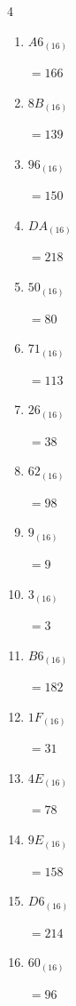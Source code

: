 \begin{multicols}{4}
\begin{enumerate}
  \item $A6_{(16)}$

        $=166$

  \item $8B_{(16)}$

        $=139$

  \item $96_{(16)}$

        $=150$

\columnbreak %

\resetques

  \item $DA_{(16)}$

        $=218$

  \item $50_{(16)}$

        $=80$

  \item $71_{(16)}$

        $=113$

  \item $26_{(16)}$

        $=38$

  \item $62_{(16)}$

        $=98$

  \item $9_{(16)}$

        $=9$

  \item $3_{(16)}$

        $=3$

  \item $B6_{(16)}$

        $=182$

  \item $1F_{(16)}$

        $=31$

  \item $4E_{(16)}$

        $=78$

  \item $9E_{(16)}$

        $=158$

  \item $D6_{(16)}$

        $=214$

  \item $60_{(16)}$

        $=96$


\end{enumerate}
\end{multicols}
